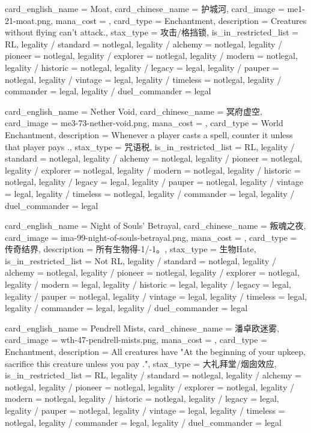 \documentclass[lang = cn, color = black, 10pt]{AllThatStax}
\begin{document}
\card
{
	card_english_name = {Moat},
	card_chinese_name = {护城河},
	card_image = me1-21-moat.png,
	mana_cost = ,
	card_type = Enchantment,
	description = {Creatures without flying can't attack.},
	stax_type = 攻击/格挡锁,
	is_in_restricted_list = RL,
	legality / standard = notlegal,
	legality / alchemy = notlegal,
	legality / pioneer = notlegal,
	legality / explorer = notlegal,
	legality / modern = notlegal,
	legality / historic = notlegal,
	legality / legacy = legal,
	legality / pauper = notlegal,
	legality / vintage = legal,
	legality / timeless = notlegal,
	legality / commander = legal,
	legality / duel_commander = legal
}

\card
{
	card_english_name = {Nether Void},
	card_chinese_name = {冥府虚空},
	card_image = me3-73-nether-void.png,
	mana_cost = ,
	card_type = World Enchantment,
	description = {Whenever a player casts a spell, counter it unless that player pays .},
	stax_type = 咒语税,
	is_in_restricted_list = RL,
	legality / standard = notlegal,
	legality / alchemy = notlegal,
	legality / pioneer = notlegal,
	legality / explorer = notlegal,
	legality / modern = notlegal,
	legality / historic = notlegal,
	legality / legacy = legal,
	legality / pauper = notlegal,
	legality / vintage = legal,
	legality / timeless = notlegal,
	legality / commander = legal,
	legality / duel_commander = legal
}

\card
{
	card_english_name = {Night of Souls' Betrayal},
	card_chinese_name = {叛魂之夜},
	card_image = ima-99-night-of-souls-betrayal.png,
	mana_cost = ,
	card_type = 传奇结界,
	description = {所有生物得-1/-1。},
	stax_type = 生物Hate,
	is_in_restricted_list = Not RL,
	legality / standard = notlegal,
	legality / alchemy = notlegal,
	legality / pioneer = notlegal,
	legality / explorer = notlegal,
	legality / modern = legal,
	legality / historic = legal,
	legality / legacy = legal,
	legality / pauper = notlegal,
	legality / vintage = legal,
	legality / timeless = legal,
	legality / commander = legal,
	legality / duel_commander = legal
}

\card
{
	card_english_name = {Pendrell Mists},
	card_chinese_name = {潘卓欧迷雾},
	card_image = wth-47-pendrell-mists.png,
	mana_cost = ,
	card_type = Enchantment,
	description = {All creatures have "At the beginning of your upkeep, sacrifice this creature unless you pay ."},
	stax_type = 大礼拜堂/烟囱效应,
	is_in_restricted_list = RL,
	legality / standard = notlegal,
	legality / alchemy = notlegal,
	legality / pioneer = notlegal,
	legality / explorer = notlegal,
	legality / modern = notlegal,
	legality / historic = notlegal,
	legality / legacy = legal,
	legality / pauper = notlegal,
	legality / vintage = legal,
	legality / timeless = notlegal,
	legality / commander = legal,
	legality / duel_commander = legal
}
\end{document}

